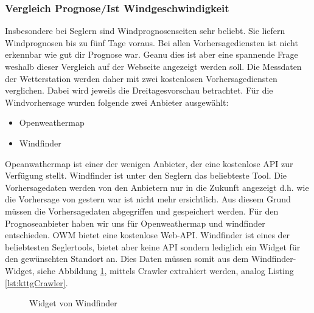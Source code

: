 \subsubsection{Vergleich Prognose/Ist Windgeschwindigkeit}
Insbesondere bei Seglern sind Windprognosenseiten sehr beliebt. Sie liefern Windprognosen bis zu fünf Tage voraus. Bei allen Vorhersagediensten ist nicht erkennbar wie gut dir Prognose war. Geanu dies ist aber eine spannende Frage weshalb dieser Vergleich auf der Webseite angezeigt werden soll. Die Messdaten der Wetterstation werden daher mit zwei kostenlosen Vorhersagediensten verglichen. Dabei wird jeweils die Dreitagesvorschau betrachtet. Für die Windvorhersage wurden folgende zwei Anbieter ausgewählt:

\begin{itemize}
\item Openweathermap
\item Windfinder
\end{itemize}

\noindent
Opeanwathermap ist einer der wenigen Anbieter, der eine kostenlose API zur Verfügung stellt. Windfinder ist unter den Seglern das beliebteste Tool. Die Vorhersagedaten werden von den Anbietern nur in die Zukunft angezeigt d.h. wie die Vorhersage von gestern war ist nicht mehr ersichtlich. Aus diesem Grund müssen die Vorhersagedaten abgegriffen und gespeichert werden. Für den Prognoseanbieter haben wir uns für Openweathermap und windfinder entschieden. OWM bietet eine kostenlose Web-API. Windfinder ist eines der beliebtesten Seglertools, bietet aber keine API sondern lediglich ein Widget für den gewünschten Standort an. Dies Daten müssen somit aus dem Windfinder-Widget, siehe Abbildung \ref{img:windfinder}, mittels Crawler extrahiert werden, analog Listing \ref{lst:kttgCrawler}.

\begin{figure}[h!]
	\centering
	\caption{Widget von Windfinder}
	\label{img:windfinder}
\end{figure}

